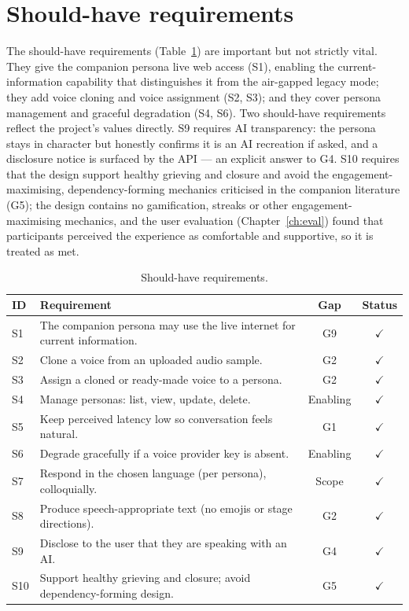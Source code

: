 \documentclass[11pt,a4paper]{report}
\let\amscheckmark\checkmark
\renewcommand{\checkmark}{\ensuremath{\amscheckmark}}
\begin{document}
\section{Should-have requirements}
The should-have requirements (Table~\ref{tab:should}) are important but not strictly vital. They give the companion persona live web access (S1), enabling the current-information capability that distinguishes it from the air-gapped legacy mode; they add voice cloning and voice assignment (S2, S3); and they cover persona management and graceful degradation (S4, S6). Two should-have requirements reflect the project's values directly. S9 requires AI transparency: the persona stays in character but honestly confirms it is an AI recreation if asked, and a disclosure notice is surfaced by the API --- an explicit answer to G4. S10 requires that the design support healthy grieving and closure and avoid the engagement-maximising, dependency-forming mechanics criticised in the companion literature (G5); the design contains no gamification, streaks or other engagement-maximising mechanics, and the user evaluation (Chapter~\ref{ch:eval}) found that participants perceived the experience as comfortable and supportive, so it is treated as met.

\begin{table}[htbp]
\centering
\caption{Should-have requirements.}
\label{tab:should}
\small
\begin{tabularx}{\linewidth}{@{}l X c c@{}}
\toprule
\textbf{ID} & \textbf{Requirement} & \textbf{Gap} & \textbf{Status} \\
\midrule
S1  & The companion persona may use the live internet for current information. & G9 & \checkmark \\
S2  & Clone a voice from an uploaded audio sample. & G2 & \checkmark \\
S3  & Assign a cloned or ready-made voice to a persona. & G2 & \checkmark \\
S4  & Manage personas: list, view, update, delete. & Enabling & \checkmark \\
S5  & Keep perceived latency low so conversation feels natural. & G1 & \checkmark \\
S6  & Degrade gracefully if a voice provider key is absent. & Enabling & \checkmark \\
S7  & Respond in the chosen language (per persona), colloquially. & Scope & \checkmark \\
S8  & Produce speech-appropriate text (no emojis or stage directions). & G2 & \checkmark \\
S9  & Disclose to the user that they are speaking with an AI. & G4 & \checkmark \\
S10 & Support healthy grieving and closure; avoid dependency-forming design. & G5 & \checkmark \\
\bottomrule
\end{tabularx}
\end{table}
\end{document}

